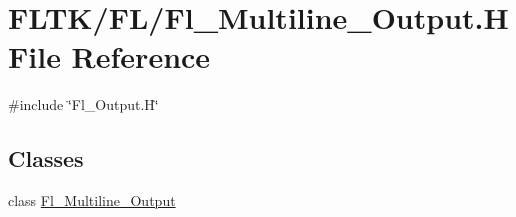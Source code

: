 \hypertarget{_fl___multiline___output_8_h}{}\section{F\+L\+T\+K/\+F\+L/\+Fl\+\_\+\+Multiline\+\_\+\+Output.H File Reference}
\label{_fl___multiline___output_8_h}
{\ttfamily \#include \char`\"{}Fl\+\_\+\+Output.\+H\char`\"{}}\newline
\subsection*{Classes}
\begin{DoxyCompactItemize}
\item 
class \hyperlink{class_fl___multiline___output}{Fl\+\_\+\+Multiline\+\_\+\+Output}
\end{DoxyCompactItemize}
